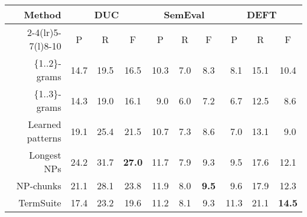       \begin{table*}
        \centering
        \begin{tabular}{@{~}rccccccccc@{~}}
          \toprule
          \multirow{2}{*}[-2pt]{\textbf{Method}} & \multicolumn{3}{c}{\textbf{DUC}} & \multicolumn{3}{c}{\textbf{SemEval}} & \multicolumn{3}{c}{\textbf{DEFT}}\\
          \cmidrule(r){2-4}\cmidrule(lr){5-7}\cmidrule(l){8-10}
          & P & R & F & P & R & F & P & R & F\\
          \midrule
          \{1..2\}-grams & 14.7 & 19.5 & 16.5 & 10.3 & $~~$7.0 & $~~$8.3 & $~~$8.1 & 15.1 & 10.4\\
          \{1..3\}-grams & 14.3 & 19.0 & 16.1 & $~~$9.0 & $~~$6.0 & $~~$7.2 & $~~$6.7 & 12.5 & $~~$8.6\\
          Learned patterns & 19.1 & 25.4 & 21.5 & 10.7 & $~~$7.3 & $~~$8.6 & $~~$7.0 & 13.1 & $~~$9.0\\
          Longest NPs & 24.2 & 31.7 & \textbf{27.0} & 11.7 & $~~$7.9 & $~~$9.3 & $~~$9.5 & 17.6 & 12.1\\
          NP-chunks & 21.1 & 28.1 & 23.8 & 11.9 & $~~$8.0 & \textbf{$~~$9.5} & $~~$9.6 & 17.9 & 12.3\\
          TermSuite & 17.4 & 23.2 & 19.6 & 11.2 & $~~$8.1 & $~~$9.3 & 11.3 & 21.1 & \textbf{14.5}\\
          \bottomrule
        \end{tabular}
        \caption{Comparison of candidate extraction methods, when extracting 10
                 keyphrases with \textbf{TF-IDF}.
                 \label{tab:tfidf_results}}
      \end{table*}
